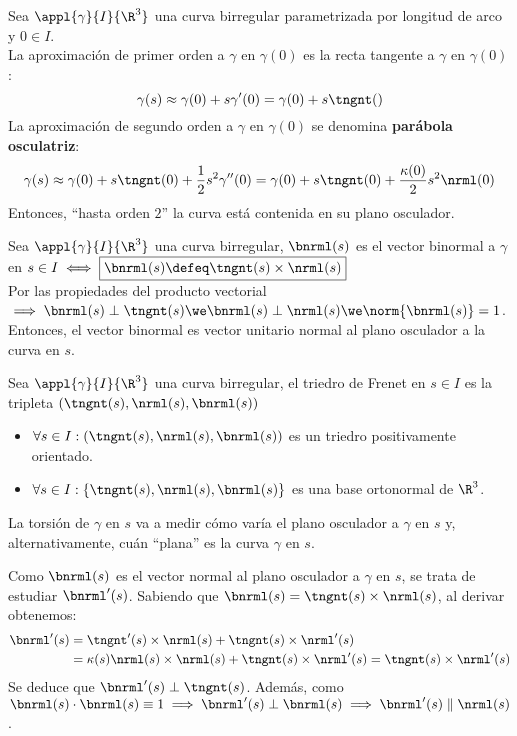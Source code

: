 Sea $\appl{\gamma}{I}{\R^3}$ una curva birregular parametrizada por longitud de arco y $0 \in I$. \\
La aproximación de primer orden a $\gamma$ en $\gamma(0)$ es la recta tangente a $\gamma$ en $\gamma(0)$:
\[\gamma(s)\approx\gamma(0) + s\gamma'(0)=\gamma(0)+s\tngnt()\]
La aproximación de segundo orden a $\gamma$ en $\gamma(0)$ se denomina \textbf{parábola osculatriz}:
\[\gamma(s)\approx\gamma(0) + s\tngnt(0) + \frac{1}{2}s^2\gamma''(0)=\gamma(0) + s\tngnt(0) + \frac{\kappa(0)}{2}s^2\nrml(0)\]
Entonces, ``hasta orden $2$'' la curva está contenida en su plano osculador.
\begin{defn}
	Sea $\appl{\gamma}{I}{\R^3}$ una curva birregular, $\bnrml(s)$ es el vector binormal a $\gamma$ en $s\in I \iff \boxed{\bnrml(s)\defeq\tngnt(s)\times\nrml(s)}$ \\
	Por las propiedades del producto vectorial $ \implies \bnrml(s) \perp \tngnt(s) \we \bnrml(s) \perp \nrml(s) \we \norm{\bnrml(s)}=1$.
	Entonces, el vector binormal es vector unitario normal al plano osculador a la curva en $s$.
\end{defn}
\begin{defn}
	Sea $\appl{\gamma}{I}{\R^3}$ una curva birregular, el triedro de Frenet en $s\in I$ es la tripleta $\left(\tngnt(s), \nrml(s), \bnrml(s)\right)$
	\begin{itemize}
		\item $\forall s \in I : \left(\tngnt(s), \nrml(s), \bnrml(s)\right)$ es un triedro positivamente orientado.
		\item $\forall s \in I : \{\tngnt(s), \nrml(s), \bnrml(s)\}$ es una base ortonormal de $\R^3$.
	\end{itemize}
\end{defn}
La torsión de $\gamma$ en $s$ va a medir cómo varía el plano osculador a $\gamma$ en $s$ y, alternativamente, cuán ``plana'' es la curva $\gamma$ en $s$.

Como $\bnrml(s)$ es el vector normal al plano osculador a $\gamma$ en $s$, se trata de estudiar $\bnrml'(s)$. Sabiendo que $\bnrml(s)=\tngnt(s)\times\nrml(s)$, al derivar obtenemos:
\[\begin{aligned}
		\bnrml'(s) & =\tngnt'(s)\times\nrml(s)+\tngnt(s)\times\nrml'(s)                                    \\
		           & = \kappa(s)\nrml(s)\times\nrml(s)+\tngnt(s)\times\nrml'(s) = \tngnt(s)\times\nrml'(s)
	\end{aligned}\]
Se deduce que $\bnrml'(s) \perp \tngnt(s)$. Además, como $\bnrml(s)\cdot\bnrml(s)\equiv1 \implies \bnrml'(s)\perp\bnrml(s) \implies \bnrml'(s) \parallel \nrml(s)$.

